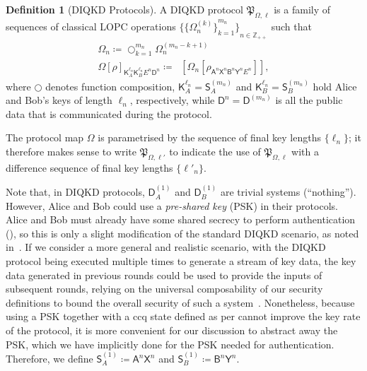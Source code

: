 \documentclass[10pt, a4paper]{article}
\numberwithin{equation}{section} %
\newcounter{stmt} %
\theoremstyle{definition}
\newtheorem{defn}[stmt]{Definition}
\theoremstyle{plain}
\newcommand{\?}{\mathrel{?}} %
\newcommand{\Z}{\mathbb{Z}} %
\newcommand{\Tr}[2][]{\mathop{\mathrm{Tr}#1}\left[ #2 \right]} %
\newcommand{\crv}[1]{\mathsf{#1}}
\newcommand{\proto}[2][\ell]{\mathfrak{P}_{#2, #1}}
\begin{document}
    \begin{defn}[DIQKD Protocols]\label{def:diqkdproto}
      A DIQKD protocol \(\proto{\Omega}\) is a family of sequences of classical LOPC operations \({\{{\{\Omega^{(k)}_{n}\}}_{k=1}^{m_n}\}}_{n\in\Z_{++}}\) such that 
      \begin{gather}
        \Omega_n \coloneqq \bigcirc_{k=1}^{m_n} \Omega^{(m_n - k + 1)}_{n} \\
        {\Omega[\rho]}_{\crv{K}_{A}^{\ell_n} \crv{K}_{B}^{\ell_n} E^n \crv{D}^n} \coloneqq \Tr[_{\crv{D}^{(m_n)}_A \crv{D}^{(m_n)}_B}]{ \Omega_n \left[ \rho_{\crv{A}^n\crv{X}^n \crv{B}^n\crv{Y}^n E^n} \right] },
      \end{gather}
      where \(\bigcirc\) denotes function composition, \(\crv{K}_{A}^{\ell_n} = \crv{S}_{A}^{(m_n)}\) and \(\crv{K}_{B}^{\ell_n} = \crv{S}_{B}^{(m_n)}\) hold Alice and Bob's keys of length \(\ell_n\), respectively, while \(\crv{D}^n = \crv{D}^{(m_n)}\) is all the public data that is communicated during the protocol.

      The protocol map \(\Omega\) is parametrised by the sequence of final key lengths \(\{\ell_n\}\); it therefore makes sense to write \(\proto[\ell']{\Omega}\) to indicate the use of \(\proto{\Omega}\) with a difference sequence of final key lengths \(\{\ell'_n\}\).
    \end{defn}

    Note that, in DIQKD protocols, \(\crv{D}^{(1)}_A\) and \(\crv{D}^{(1)}_B\) are trivial systems (``nothing''). However, Alice and Bob could use a \emph{pre-shared key} (PSK) in their protocols. Alice and Bob must already have some shared secrecy to perform authentication (), so this is only a slight modification of the standard DIQKD scenario, as noted in~\cite{DIQKD_FiniteSize}. If we consider a more general and realistic scenario, with the DIQKD protocol being executed multiple times to generate a stream of key data, the key data generated in previous rounds could be used to provide the inputs of subsequent rounds, relying on the universal composability of our security definitions to bound the overall security of such a system~\cite{QCryptCompose}. Nonetheless, because using a PSK together with a ccq state defined as per  cannot improve the key rate of the protocol, it is more convenient for our discussion to abstract away the PSK, which we have implicitly done for the PSK needed for authentication. Therefore, we define \(\crv{S}_A^{(1)} \coloneqq \crv{A}^n\crv{X}^n\) and \(\crv{S}_B^{(1)} \coloneqq \crv{B}^n\crv{Y}^n\).
\end{document}
